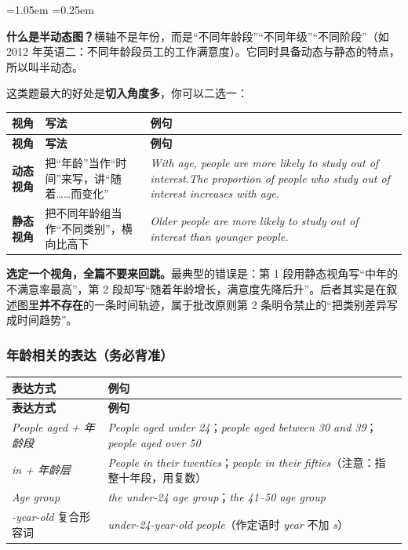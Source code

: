 \documentclass[11pt,a4paper]{ctexart}
\newcommand{\en}[1]{\textit{#1}}
\newcommand{\zone}[1]{\par\addvspace{3pt}\noindent{\bfseries\color{accent}【雷区】}#1\par\addvspace{3pt}}
\newenvironment{note}{%
  \par\addvspace{5pt}%
  \begin{list}{}{\leftmargin=1.05em \rightmargin=0.25em \listparindent=0pt
    \itemindent=0pt \topsep=0pt \parsep=2pt \itemsep=2pt \partopsep=0pt}%
  \item\relax\small\color{ink}%
}{%
  \end{list}\addvspace{5pt}%
}
\begin{document}
\begin{note}
\textbf{什么是半动态图？}横轴不是年份，而是“不同年龄段”“不同年级”“不同阶段”（如 2012 年英语二：不同年龄段员工的工作满意度）。它同时具备动态与静态的特点，所以叫半动态。
\end{note}

这类题最大的好处是\textbf{切入角度多}，你可以二选一：

\begin{longtable}{C{2.6cm} L{5.9cm} L{5.9cm}}
\toprule
\textbf{视角} & \textbf{写法} & \textbf{例句}\\
\midrule
\endfirsthead
\toprule
\textbf{视角} & \textbf{写法} & \textbf{例句}\\
\midrule
\endhead
\textbf{动态视角} & 把“年龄”当作“时间”来写，讲“随着……而变化” & \en{With age, people are more likely to study out of interest.}\newline \en{The proportion of people who study out of interest increases with age.}\\
\midrule
\textbf{静态视角} & 把不同年龄组当作“不同类别”，横向比高下 & \en{Older people are more likely to study out of interest than younger people.}\\
\bottomrule
\end{longtable}

\zone{\textbf{选定一个视角，全篇不要来回跳。}最典型的错误是：第 1 段用静态视角写“中年的不满意率最高”，第 2 段却写“随着年龄增长，满意度先降后升”。后者其实是在叙述图里\textbf{并不存在}的一条时间轨迹，属于批改原则第 2 条明令禁止的“把类别差异写成时间趋势”。}

\subsubsection{年龄相关的表达（务必背准）}

\begin{longtable}{C{4.4cm} L{10.0cm}}
\toprule
\textbf{表达方式} & \textbf{例句}\\
\midrule
\endfirsthead
\toprule
\textbf{表达方式} & \textbf{例句}\\
\midrule
\endhead
\en{People aged + 年龄段} & \en{People aged under 24}；\en{people aged between 30 and 39}；\en{people aged over 50}\\
\midrule
\en{in + 年龄层} & \en{People in their twenties}；\en{people in their fifties}（注意：指整十年段，用复数）\\
\midrule
\en{Age group} & \en{the under-24 age group}；\en{the 41--50 age group}\\
\midrule
\en{-year-old} 复合形容词 & \en{under-24-year-old people}（作定语时 \en{year} 不加 \en{s}）\\
\bottomrule
\end{longtable}
\end{document}
